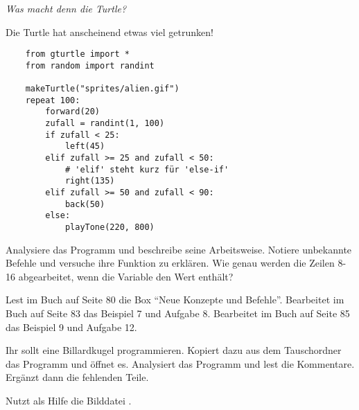 \documentclass[10pt, a4paper]{arbeitsblatt}
\begin{document}
\ReiheTitel

\begin{aufgabe}[icon=\iconBlatt\,\iconEinzel]
	\begin{center}
		\emph{Was macht denn die Turtle?}
	\end{center}

	Die Turtle hat anscheinend etwas viel getrunken!

	\begin{verbatim}
	from gturtle import *
	from random import randint

	makeTurtle("sprites/alien.gif")
	repeat 100:
		forward(20)
		zufall = randint(1, 100)
		if zufall < 25:
			left(45)
		elif zufall >= 25 and zufall < 50:
			# 'elif' steht kurz für 'else-if'
			right(135)
		elif zufall >= 50 and zufall < 90:
			back(50)
		else:
			playTone(220, 800)
	\end{verbatim}

	\begin{teilaufgaben}
		\teilaufgabe Analysiere das Programm und beschreibe seine Arbeitsweise. Notiere unbekannte Befehle und versuche ihre Funktion zu erklären.
		\teilaufgabe Wie genau werden die Zeilen 8-16 abgearbeitet, wenn die Variable  den Wert  enthält?
	\end{teilaufgaben}
\end{aufgabe}

\begin{aufgabe}[icon=\iconBuch\,\iconComputer\,\iconPartner]
	\begin{teilaufgaben}
		\teilaufgabe Lest im Buch auf Seite 80 die Box \enquote{Neue Konzepte und Befehle}.
		\teilaufgabe Bearbeitet im Buch auf Seite 83 das Beispiel 7 und Aufgabe 8.
		\teilaufgabe Bearbeitet im Buch auf Seite 85 das Beispiel 9 und Aufgabe 12.
	\end{teilaufgaben}
\end{aufgabe}

\begin{aufgabe*}[icon=\iconComputer\,\iconPartner]
	Ihr sollt eine Billardkugel programmieren. Kopiert dazu aus dem Tauschordner das Programm  und öffnet es. Analysiert das Programm und lest die Kommentare. Ergänzt dann die fehlenden Teile.

	Nutzt als Hilfe die Bilddatei .
\end{aufgabe*}
\end{document}
